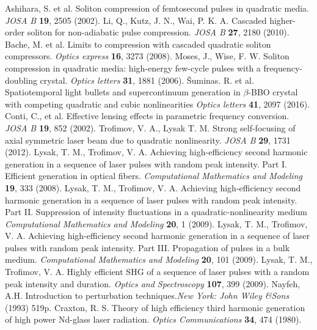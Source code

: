 \documentclass[a4paper, 12pt, onecolumn]{extarticle}
\begin{document}
\begin{thebibliography}{0}
 Ashihara, S. et al. Soliton compression of femtosecond pulses in quadratic media. \textit{JOSA B} \textbf{19}, 2505 (2002).
 Li, Q., Kutz, J. N., Wai, P. K. A. Cascaded higher-order soliton for non-adiabatic pulse compression. \textit{JOSA B} \textbf{27}, 2180 (2010).
 Bache, M. et al. Limits to compression with cascaded quadratic soliton compressors. \textit{Optics express} \textbf{16}, 3273 (2008).
 Moses, J., Wise, F. W. Soliton compression in quadratic media: high-energy few-cycle pulses with a frequency-doubling crystal. \textit{Optics letters} \textbf{31}, 1881 (2006).
 \v{S}uminas. R. et al. Spatiotemporal light bullets and supercontinuum generation in $\beta$-BBO crystal with competing quadratic and cubic nonlinearities \textit{Optics letters} \textbf{41}, 2097 (2016).
 Conti, C., et al. Effective lensing effects in parametric frequency conversion. \textit{JOSA B} \textbf{19},  852 (2002).
 Trofimov, V. A., Lysak T. M. Strong self-focusing of axial symmetric laser beam due to quadratic nonlinearity. \textit{JOSA B} \textbf{29}, 1731 (2012).
 Lysak, T. M., Trofimov, V. A. Achieving high-efficiency second harmonic generation in a sequence of laser pulses with random peak intensity. Part I. Efficient generation in optical fibers. \textit{Computational Mathematics and Modeling} \textbf{19}, 333 (2008).
 Lysak, T. M., Trofimov, V. A. Achieving high-efficiency second harmonic generation in a sequence of laser pulses with random peak intensity. Part II. Suppression of intensity fluctuations in a quadratic-nonlinearity medium \textit{Computational Mathematics and Modeling} \textbf{20}, 1 (2009).
 Lysak, T. M., Trofimov, V. A. Achieving high-efficiency second harmonic generation in a sequence of laser pulses with random peak intensity. Part III. Propagation of pulses in a bulk medium. \textit{Computational Mathematics and Modeling} \textbf{20}, 101 (2009).
 Lysak, T. M., Trofimov, V. A. Highly efficient SHG of a sequence of laser pulses with a random peak intensity and duration. \textit{Optics and Spectroscopy} \textbf{107}, 399 (2009).
 Nayfeh, A.H. Introduction to perturbation techniques.\textit{New York: John Wiley \&Sons} (1993) 519p.
 Craxton, R. S. Theory of high efficiency third harmonic generation of high power Nd-glass laser radiation. \textit{Optics Communications} \textbf{34}, 474 (1980).


\end{thebibliography}
\end{document}
